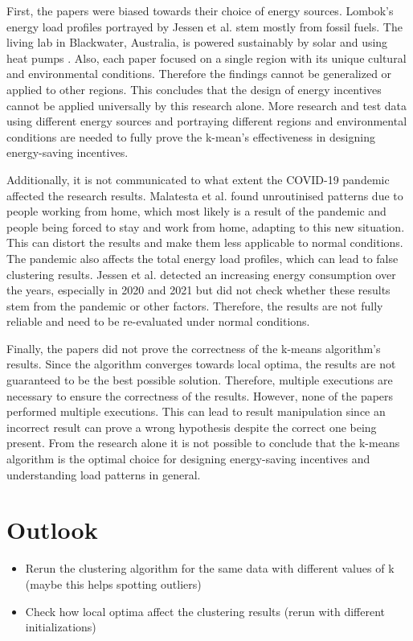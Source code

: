 First, the papers were biased towards their choice of energy sources.
Lombok's energy load profiles portrayed by Jessen et al. \cite{JES-IND} stem mostly from fossil fuels.
The living lab in Blackwater, Australia, is powered sustainably by solar and using heat pumps \cite{MAL-HBP}.
Also, each paper focused on a single region with its unique cultural and environmental conditions.
Therefore the findings cannot be generalized or applied to other regions.
This concludes that the design of energy incentives cannot be applied universally by this research alone.
More research and test data using different energy sources and portraying different regions and environmental conditions are needed to fully prove the k-mean's effectiveness in designing energy-saving incentives. 

Additionally, it is not communicated to what extent the COVID-19 pandemic affected the research results.
Malatesta et al. \cite{MAL-HBP} found unroutinised patterns due to people working from home, which most likely is a result of the pandemic and people being forced to stay and work from home, adapting to this new situation.
This can distort the results and make them less applicable to normal conditions.
The pandemic also affects the total energy load profiles, which can lead to false clustering results.
Jessen et al. \cite{JES-IND} detected an increasing energy consumption over the years, especially in 2020 and 2021 but did not check whether these results stem from the pandemic or other factors.
Therefore, the results are not fully reliable and need to be re-evaluated under normal conditions.

Finally, the papers did not prove the correctness of the k-means algorithm's results.
Since the algorithm converges towards local optima, the results are not guaranteed to be the best possible solution.
Therefore, multiple executions are necessary to ensure the correctness of the results.
However, none of the papers performed multiple executions.
This can lead to result manipulation since an incorrect result can prove a wrong hypothesis despite the correct one being present.
From the research alone it is not possible to conclude that the k-means algorithm is the optimal choice for designing energy-saving incentives and understanding load patterns in general.


\section{Outlook}
\begin{itemize}
    \item Rerun the clustering algorithm for the same data with different values of k (maybe this helps spotting outliers)
    \item Check how local optima affect the clustering results (rerun with different initializations)
\end{itemize}

